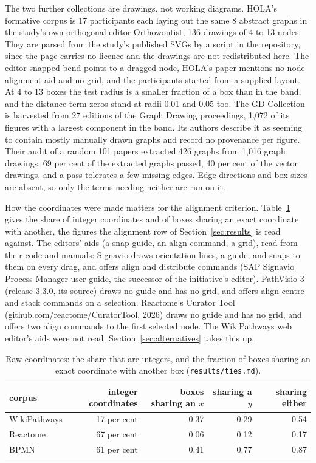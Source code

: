 \documentclass[11pt]{article}
\begin{document}
The two further collections are drawings, not working diagrams. HOLA's formative corpus
is 17 participants each laying out the same 8 abstract graphs in the study's own
orthogonal editor Orthowontist, 136 drawings of 4 to 13 nodes. They are parsed from the
study's published SVGs by a script in the repository, since the page carries no licence
and the drawings are not redistributed here. The editor snapped bend points to a dragged
node, HOLA's paper mentions no node alignment aid and no grid, and the participants
started from a supplied layout. At 4 to 13 boxes the test radius is a smaller fraction of a box than in the band,
and the distance-term zeros stand at radii 0.01 and 0.05 too. The GD Collection is harvested from 27 editions of the Graph Drawing proceedings, 1,072
of its figures with a largest component in the band. Its authors describe it as seeming to
contain mostly manually drawn graphs and record no provenance per figure. Their audit of a
random 101 papers extracted 426 graphs from 1,016 graph drawings; 69 per cent of the
extracted graphs passed, 40 per cent of the vector drawings, and a pass tolerates a few
missing edges. Edge directions and box sizes are absent, so only the terms needing neither
are run on it.

How the coordinates were made matters for the alignment criterion.
Table~\ref{tab:ties} gives the share of integer coordinates and of boxes sharing an exact
coordinate with another, the figures the alignment row of Section~\ref{sec:results} is
read against. The editors' aids (a snap guide, an align command, a grid), read from their
code and manuals: Signavio draws orientation lines, a guide, and snaps to them on every
drag, and offers align and distribute commands (SAP Signavio Process Manager user guide,
the successor of the initiative's editor). PathVisio 3 (release 3.3.0, its source) draws
no guide and has no grid, and offers align-centre and stack commands on a selection.
Reactome's Curator Tool (github.com/reactome/CuratorTool, 2026) draws no guide and has no
grid, and offers two align commands to the first selected node. The WikiPathways web
editor's aids were not read. Section~\ref{sec:alternatives} takes this up.

\begin{table}[!htbp]\centering\small
\begin{tabular}{lrrrr}
\toprule
corpus & integer coordinates & boxes sharing an $x$ & sharing a $y$ & sharing either \\
\midrule
WikiPathways & 17 per cent & 0.37 & 0.29 & 0.54 \\
Reactome & 67 per cent & 0.06 & 0.12 & 0.17 \\
BPMN & 61 per cent & 0.41 & 0.77 & 0.87 \\
\bottomrule
\end{tabular}
\caption{Raw coordinates: the share that are integers, and the fraction of boxes sharing
an exact coordinate with another box (\texttt{results/ties.md}).}
\label{tab:ties}
\end{table}
\end{document}
